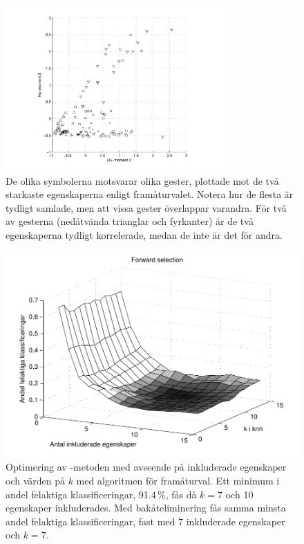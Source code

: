\documentclass[../rapport_MVEX01-11-05]{subfiles}
\begin{document}
\begin{figure}[p]
  \centering
  \includegraphics[width=0.75\textwidth,trim=2cm 0.5cm 2cm 0,clip=true]{bilder/feats-10+11}
  \caption{De olika symbolerna motsvarar olika gester, plottade mot de två starkaste egenskaperna
  enligt framåturvalet. Notera hur de flesta är tydligt samlade, men att
	vissa gester överlappar varandra. För två av gesterna (nedåtvända trianglar och fyrkanter) 
	är de två egenskaperna tydligt korrelerade, medan de inte är det för andra.}
  \label{fig:feats1011}
\end{figure}

\begin{figure}[p]
    \begin{center}
        \includegraphics[width=0.75\columnwidth,clip=true]{bilder/fwd_sel}
    \end{center}
    \caption{Optimering av \knn-metoden med avseende på inkluderade egenskaper
och värden på $k$ med algoritmen för framåturval. Ett minimum i
andel felaktiga klassificeringar, 91.4\,\%, fås då
$k=7$ och 10 egenskaper inkluderades. Med bakåteliminering fås
samma minsta andel felaktiga klassificeringar, fast med 7 inkluderade egenskaper
och $k=7$.}
    \label{fig:knn-optimering}
\end{figure}
\end{document}
